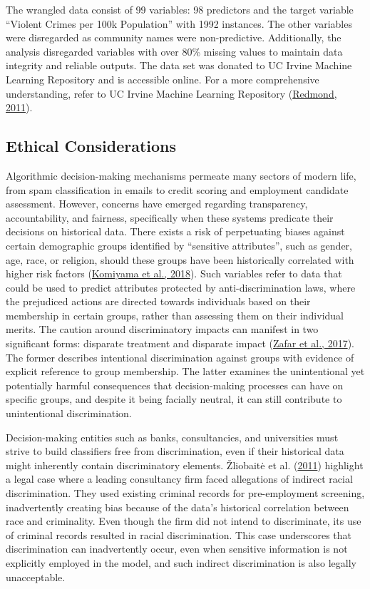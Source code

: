 \documentclass[
  11pt,
]{article}
\begin{document}
The wrangled data consist of 99 variables: 98 predictors and the target
variable ``Violent Crimes per 100k Population'' with 1992 instances. The
other variables were disregarded as community names were non-predictive.
Additionally, the analysis disregarded variables with over 80\% missing
values to maintain data integrity and reliable outputs. The data set was
donated to UC Irvine Machine Learning Repository and is accessible
online. For a more comprehensive understanding, refer to UC Irvine
Machine Learning Repository
(\protect\hyperlink{ref-misc_communities_and_crime_unnormalized_211}{Redmond,
2011}).

\subsection{Ethical Considerations}

Algorithmic decision-making mechanisms permeate many sectors of modern
life, from spam classification in emails to credit scoring and
employment candidate assessment. However, concerns have emerged
regarding transparency, accountability, and fairness, specifically when
these systems predicate their decisions on historical data. There exists
a risk of perpetuating biases against certain demographic groups
identified by ``sensitive attributes'', such as gender, age, race, or
religion, should these groups have been historically correlated with
higher risk factors (\protect\hyperlink{ref-Komiyama2018}{Komiyama et
al., 2018}). Such variables refer to data that could be used to predict
attributes protected by anti-discrimination laws, where the prejudiced
actions are directed towards individuals based on their membership in
certain groups, rather than assessing them on their individual merits.
The caution around discriminatory impacts can manifest in two
significant forms: disparate treatment and disparate impact
(\protect\hyperlink{ref-Zafar2017}{Zafar et al., 2017}). The former
describes intentional discrimination against groups with evidence of
explicit reference to group membership. The latter examines the
unintentional yet potentially harmful consequences that decision-making
processes can have on specific groups, and despite it being facially
neutral, it can still contribute to unintentional discrimination.

Decision-making entities such as banks, consultancies, and universities
must strive to build classifiers free from discrimination, even if their
historical data might inherently contain discriminatory elements.
Žliobaitė et al. (\protect\hyperlink{ref-Zliobaite2011}{2011}) highlight
a legal case where a leading consultancy firm faced allegations of
indirect racial discrimination. They used existing criminal records for
pre-employment screening, inadvertently creating bias because of the
data's historical correlation between race and criminality. Even though
the firm did not intend to discriminate, its use of criminal records
resulted in racial discrimination. This case underscores that
discrimination can inadvertently occur, even when sensitive information
is not explicitly employed in the model, and such indirect
discrimination is also legally unacceptable.
\end{document}
